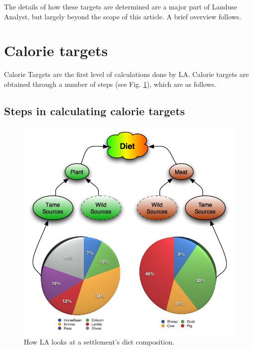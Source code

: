 The details of how these targets are determined are a major part of Landuse
Analyst, but largely beyond the scope of this article.  A brief overview follows.
\section{Calorie targets}
  Calorie Targets are the first level of calculations done by LA.  Calorie targets are obtained through a number of steps (see Fig. \ref{fig:dietDiagram}), which are as follows.

\subsection{Steps in calculating calorie targets}

\begin{figure}[ht] %
 \centering
 \includegraphics[scale=.32]{./images/dietDiagram.jpg}
 \caption{\label{fig:dietDiagram}How LA looks at a settlement's diet composition.}
\end{figure}

